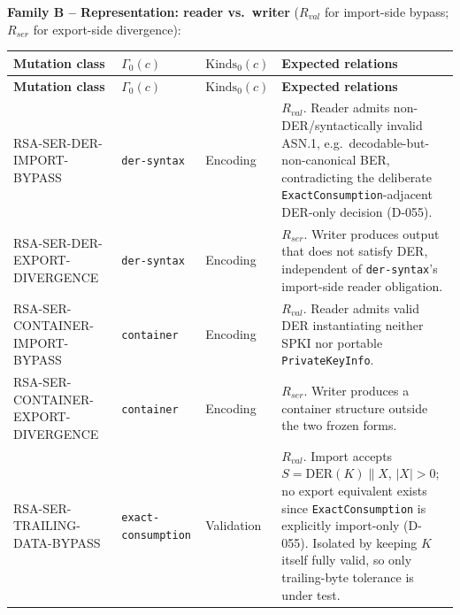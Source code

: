 \documentclass[11pt,a4paper]{article}
\begin{document}
\textbf{Family B -- Representation: reader vs.\ writer} ($R_{val}$ for import-side bypass; $R_{ser}$ for export-side divergence):
\begin{longtable}{p{}p{}p{}p{}}
\toprule
\textbf{Mutation class} & \textbf{$\Gamma_0(c)$} & \textbf{$\text{Kinds}_0(c)$} & \textbf{Expected relations}\\
\midrule\endfirsthead
\toprule
\textbf{Mutation class} & \textbf{$\Gamma_0(c)$} & \textbf{$\text{Kinds}_0(c)$} & \textbf{Expected relations}\\
\midrule\endhead
RSA-SER-DER-IMPORT-BYPASS & \texttt{der-syntax} & Encoding & $R_{val}$. Reader admits non-DER/syntactically invalid ASN.1, e.g.\ decodable-but-non-canonical BER, contradicting the deliberate \texttt{ExactConsumption}-adjacent DER-only decision (D-055).\\
RSA-SER-DER-EXPORT-DIVERGENCE & \texttt{der-syntax} & Encoding & $R_{ser}$. Writer produces output that does not satisfy DER, independent of \texttt{der-syntax}'s import-side reader obligation.\\
RSA-SER-CONTAINER-IMPORT-BYPASS & \texttt{container} & Encoding & $R_{val}$. Reader admits valid DER instantiating neither SPKI nor portable \texttt{PrivateKeyInfo}.\\
RSA-SER-CONTAINER-EXPORT-DIVERGENCE & \texttt{container} & Encoding & $R_{ser}$. Writer produces a container structure outside the two frozen forms.\\
RSA-SER-TRAILING-DATA-BYPASS & \texttt{exact-consumption} & Validation & $R_{val}$. Import accepts $S=\text{DER}(K)\|X$, $|X|>0$; no export equivalent exists since \texttt{ExactConsumption} is explicitly import-only (D-055). Isolated by keeping $K$ itself fully valid, so only trailing-byte tolerance is under test.\\
\end{longtable}
\end{document}
